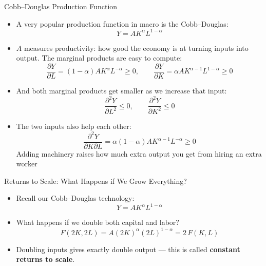 \documentclass[10pt,aspectratio=169]{beamer}
\begin{document}
\begin{frame}{Cobb--Douglas Production Function}

\begin{itemize}
    \item A very popular production function in macro is the Cobb--Douglas:
    \[
        Y = A K^{\alpha} L^{1-\alpha}
    \]
    \vspace{-0.4em}
    \item $A$ measures productivity: how good the economy is at turning inputs into output.
    \itemvso The marginal products are easy to compute:
    \[
        \frac{\partial Y}{\partial L}
        = (1-\alpha) A K^{\alpha} L^{-\alpha} \ge 0,
        \qquad
        \frac{\partial Y}{\partial K}
        = \alpha A K^{\alpha-1} L^{1-\alpha} \ge 0
    \]
    \vspace{-0.4em}
    \item And both marginal products get smaller as we increase that input:
    \[
        \frac{\partial^2 Y}{\partial L^2} \le 0, \qquad
        \frac{\partial^2 Y}{\partial K^2} \le 0
    \]
    \vspace{-0.4em}
    \item The two inputs also help each other:
    \[
        \frac{\partial^2 Y}{\partial K \partial L} = \alpha(1-\alpha)A K^{\alpha-1} L^{-\alpha} \ge 0
    \]
    Adding machinery raises how much extra output you get from hiring an extra worker
\end{itemize}

\end{frame}

\begin{frame}{Returns to Scale: What Happens if We Grow Everything?}

\begin{itemize}
    \item Recall our Cobb--Douglas technology:
    \[
        Y = A K^{\alpha} L^{1-\alpha}
    \]
    \vspace{-0.3cm}
    \item What happens if we double both capital and labor? 
    \[
        F(2K, 2L) = A (2K)^\alpha (2L)^{1-\alpha} = 2 \, F(K,L)
    \]
    \vspace{-0.3cm}
    \item Doubling inputs gives exactly double output — this is called \textbf{constant returns to scale}.
\end{itemize}

\end{frame}
\end{document}
